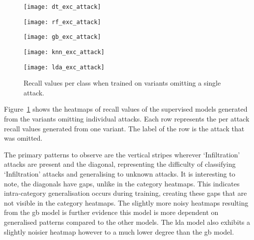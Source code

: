 %
\begin{figure}[htbp]
    \centering
    \begin{minipage}[h]{0.5\textwidth}
        \centering
        \texttt{[image: dt\_exc\_attack]}
    \end{minipage}\hfill
    \begin{minipage}[h]{0.5\textwidth}
        \centering
        \texttt{[image: rf\_exc\_attack]}
    \end{minipage}
    \begin{minipage}[h]{0.5\textwidth}
        \centering
        \texttt{[image: gb\_exc\_attack]}
    \end{minipage}\hfill
    \begin{minipage}[h]{0.5\textwidth}
        \centering
        \texttt{[image: knn\_exc\_attack]}
    \end{minipage}
    \begin{minipage}[h]{0.5\textwidth}
        \centering
        \texttt{[image: lda\_exc\_attack]}
    \end{minipage}
    \caption[Individual Attack Omission Results.]{Recall values per class when trained on variants omitting a single attack.\label{fig:exc_att}}
\end{figure}
%
Figure~\ref{fig:exc_att} shows the heatmaps of recall values of the supervised
models generated from the variants omitting individual attacks. Each row
represents the per attack recall values generated from one variant. The label
of the row is the attack that was omitted.

The primary patterns to observe are the vertical stripes wherever
`Infiltration' attacks are present and the diagonal, representing the
difficulty of classifying `Infiltration' attacks and generalising to unknown
attacks. It is interesting to note, the diagonals have gaps, unlike in the
category heatmaps. This indicates intra-category generalisation occurs during
training, creating these gaps that are not visible in the category heatmaps.
The slightly more noisy heatmaps resulting from the \gls{gb} model is further
evidence this model is more dependent on generalised patterns compared to the
other models. The \gls{lda} model also exhibits a slightly noisier heatmap
however to a much lower degree than the \gls{gb} model.

